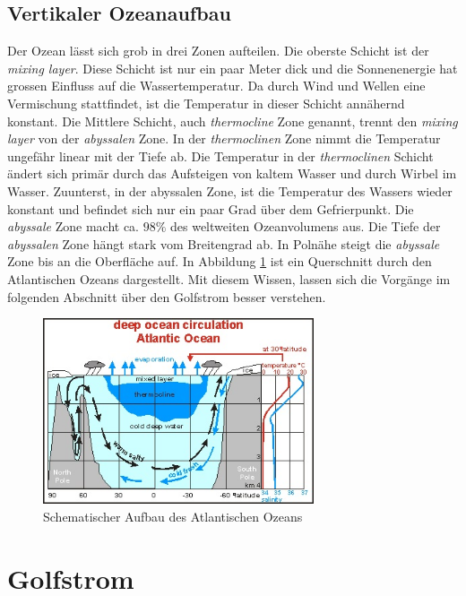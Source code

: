 \subsection{Vertikaler Ozeanaufbau}\label{thermohalin:vertikal}
Der Ozean lässt sich grob in drei Zonen aufteilen. Die oberste Schicht ist der {\em mixing layer}. Diese Schicht ist nur ein paar Meter dick und die Sonnenenergie hat grossen Einfluss auf die Wassertemperatur. Da durch Wind und Wellen eine Vermischung stattfindet, ist die Temperatur in dieser Schicht annähernd konstant. Die Mittlere Schicht, auch {\em thermocline} Zone genannt, trennt den {\em mixing layer} von der {\em abyssalen} Zone. In der {\em thermoclinen} Zone nimmt die Temperatur ungefähr linear mit der Tiefe ab. Die Temperatur in der {\em thermoclinen} Schicht ändert sich primär durch das Aufsteigen von kaltem Wasser und durch Wirbel im Wasser. Zuunterst, in der abyssalen Zone, ist die Temperatur des Wassers wieder konstant und befindet sich nur ein paar Grad über dem Gefrierpunkt. Die {\em abyssale} Zone macht ca. $98\%$ des weltweiten Ozeanvolumens aus. Die Tiefe der {\em abyssalen} Zone hängt stark vom Breitengrad ab. In Polnähe steigt die {\em abyssale} Zone bis an die Oberfläche auf.\cite{skript:kaperengler} In Abbildung \ref{thermohalin:deep-ocean-circulation} ist ein Querschnitt durch den Atlantischen Ozeans dargestellt. Mit diesem Wissen, lassen sich die Vorgänge im folgenden Abschnitt über den Golfstrom besser verstehen.

\begin{figure}
	\includegraphics[width=8cm]{thermohalin/Bilder/deep_ocean_circulation.jpg}
	\centering
	\caption{Schematischer Aufbau des Atlantischen Ozeans \cite{skript:kaperengler} \label{thermohalin:deep-ocean-circulation}}
\end{figure}


\section{Golfstrom}

